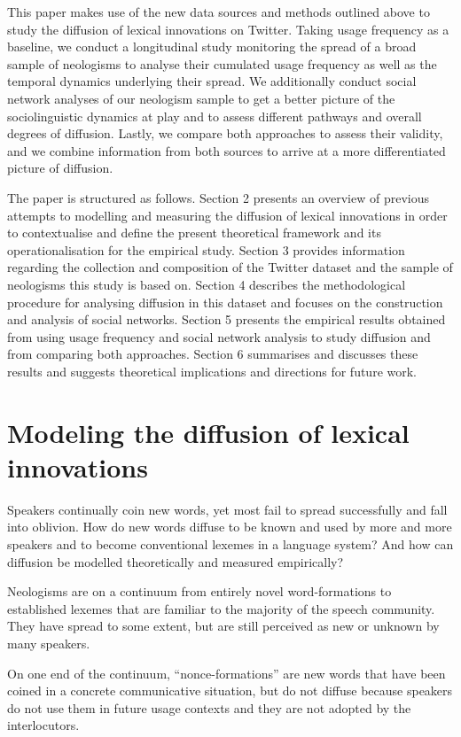 \documentclass[a4paper, abstract=on]{scrartcl}
\begin{document}
  This paper makes use of the new data sources and methods outlined above to study the diffusion of lexical innovations on Twitter. Taking usage frequency as a baseline, we conduct a longitudinal study monitoring the spread of a broad sample of neologisms to analyse their cumulated usage frequency as well as the temporal dynamics underlying their spread. We additionally conduct social network analyses of our neologism sample to get a better picture of the sociolinguistic dynamics at play and to assess different pathways and overall degrees of diffusion. Lastly, we compare both approaches to assess their validity, and we combine information from both sources to arrive at a more differentiated picture of diffusion.

  The paper is structured as follows. Section 2 presents an overview of previous attempts to modelling and measuring the diffusion of lexical innovations in order to contextualise and define the present theoretical framework and its operationalisation for the empirical study. Section 3 provides information regarding the collection and composition of the Twitter dataset and the sample of neologisms this study is based on. Section 4 describes the methodological procedure for analysing diffusion in this dataset and focuses on the construction and analysis of social networks. Section 5 presents the empirical results obtained from using usage frequency and social network analysis to study diffusion and from comparing both approaches. Section 6 summarises and discusses these results and suggests theoretical implications and directions for future work.

\section{Modeling the diffusion of lexical innovations}

    Speakers continually coin new words, yet most fail to spread successfully and fall into oblivion. How do new words diffuse to be known and used by more and more speakers and to become conventional lexemes in a language system? And how can diffusion be modelled theoretically and measured empirically?

    Neologisms are on a continuum from entirely novel word-formations to established lexemes that are familiar to the majority of the speech community. They have spread to some extent, but are still perceived as new or unknown by many speakers.

      On one end of the continuum, \enquote{nonce-formations} are new words that have been coined in a concrete communicative situation, but do not diffuse because speakers do not use them in future usage contexts and they are not adopted by the interlocutors.~\parencite{Hohenhaus1996}
\end{document}
